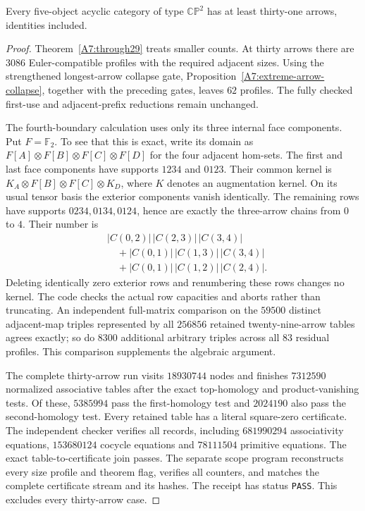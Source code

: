 \begin{theorem}
\label{A7:through30}
Every five-object acyclic category of type $\mathbb{CP}^2$ has
at least thirty-one arrows, identities included.
\end{theorem}
\begin{proof}
Theorem~\ref{A7:through29} treats smaller counts. At thirty
arrows there are $3086$ Euler-compatible profiles with the
required adjacent sizes. Using the strengthened longest-arrow
collapse gate, Proposition~\ref{A7:extreme-arrow-collapse},
together with the preceding gates, leaves $62$ profiles.
The fully checked first-use and adjacent-prefix reductions
remain unchanged.

The fourth-boundary calculation uses only its three internal
face components. Put $F=\mathbb F_2$. To see that this is exact, write its domain
as $F[A]\otimes F[B]\otimes F[C]\otimes F[D]$ for the four
adjacent hom-sets. The first and last face components have
supports $1234$ and $0123$. Their common kernel is
$K_A\otimes F[B]\otimes F[C]\otimes K_D$, where $K$ denotes
an augmentation kernel. On its usual tensor basis the exterior
components vanish identically. The remaining rows have supports
$0234,0134,0124$, hence are exactly the three-arrow chains from
$0$ to $4$. Their number is
\[
\begin{aligned}
 &|C(0,2)|\,|C(2,3)|\,|C(3,4)|\\
 &\quad+|C(0,1)|\,|C(1,3)|\,|C(3,4)|\\
 &\quad+|C(0,1)|\,|C(1,2)|\,|C(2,4)|.
\end{aligned}
\]
Deleting identically zero exterior rows and renumbering these
rows changes no kernel. The code checks the actual row capacities
and aborts rather than truncating. An independent full-matrix
comparison on the $59500$ distinct adjacent-map triples represented
by all $256856$ retained twenty-nine-arrow tables agrees exactly;
so do $8300$ additional arbitrary triples across all $83$ residual
profiles. This comparison supplements the algebraic argument.

The complete thirty-arrow run visits $18930744$ nodes and finishes
$7312590$ normalized associative tables after the exact top-homology
and product-vanishing tests. Of these, $5385994$ pass the first-homology
test and $2024190$ also pass the second-homology test. Every retained
table has a literal square-zero certificate. The independent checker
verifies all records, including $681990294$ associativity equations,
$153680124$ cocycle equations and $78111504$ primitive equations.
The exact table-to-certificate join passes. The separate scope
program reconstructs every size profile and theorem flag, verifies
all counters, and matches the complete certificate stream and its
hashes. The receipt 
has status \texttt{PASS}. This excludes every thirty-arrow case.
\end{proof}

